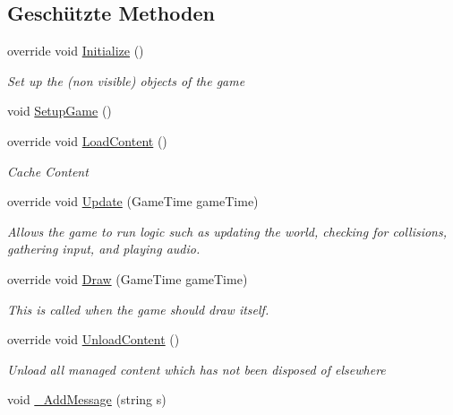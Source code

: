 \subsection*{Geschützte Methoden}
\begin{DoxyCompactItemize}
\item 
override void \hyperlink{class_gruppe22_1_1_client_1_1_game_win_acbf872adf467819377ac4d1c408ca40d}{Initialize} ()
\begin{DoxyCompactList}\small\item\em Set up the (non visible) objects of the game \end{DoxyCompactList}\item 
void \hyperlink{class_gruppe22_1_1_client_1_1_game_win_aabf0b1516b698b9a512fb926722584e8}{Setup\-Game} ()
\item 
override void \hyperlink{class_gruppe22_1_1_client_1_1_game_win_a772c14a6b97580610d01d50f02731a02}{Load\-Content} ()
\begin{DoxyCompactList}\small\item\em Cache Content \end{DoxyCompactList}\item 
override void \hyperlink{class_gruppe22_1_1_client_1_1_game_win_ab95837e63a4d001504770a1ede94dc87}{Update} (Game\-Time game\-Time)
\begin{DoxyCompactList}\small\item\em Allows the game to run logic such as updating the world, checking for collisions, gathering input, and playing audio. \end{DoxyCompactList}\item 
override void \hyperlink{class_gruppe22_1_1_client_1_1_game_win_a97058890b16ef83f39bddf96d6a77717}{Draw} (Game\-Time game\-Time)
\begin{DoxyCompactList}\small\item\em This is called when the game should draw itself. \end{DoxyCompactList}\item 
override void \hyperlink{class_gruppe22_1_1_client_1_1_game_win_a3e49751dccbf4394ceaee838de7954d9}{Unload\-Content} ()
\begin{DoxyCompactList}\small\item\em Unload all managed content which has not been disposed of elsewhere \end{DoxyCompactList}\item 
void \hyperlink{class_gruppe22_1_1_client_1_1_game_win_a5d214c9143c57cc73655a286a673d848}{\-\_\-\-Add\-Message} (string s)

\end{DoxyCompactItemize}
